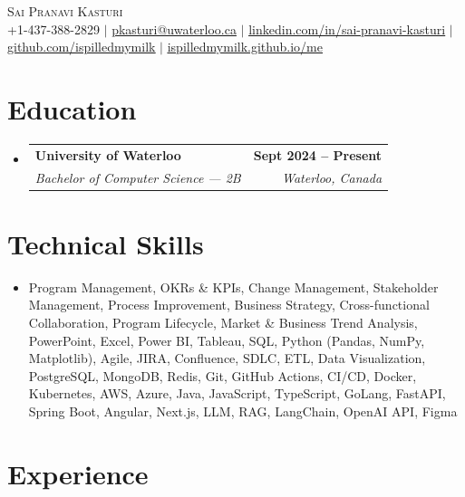 \documentclass[letterpaper,10pt]{article}
\makeatletter
\newcommand{\resumeSubheading}[4]{
  \vspace{-1pt}\item
    \begin{tabular*}{1.0\textwidth}[t]{l@{\extracolsep{\fill}}r}
      \textbf{#1} & \textbf{\small #2} \\
      \textit{\small#3} & \textit{\small #4} \\[-2pt]
    \end{tabular*}\vspace{-7pt}
}
\newcommand{\resumeSubHeadingListStart}{\begin{itemize}[leftmargin=0.0in, label={}]}
\newcommand{\resumeSubHeadingListEnd}{\end{itemize}}
\makeatother
\begin{document}

\vspace{-28pt}
\begin{center}
    {\Huge \scshape Sai Pranavi Kasturi} \\
    \small +1-437-388-2829 $|$ \underline{pkasturi@uwaterloo.ca} $|$
    \href{https://linkedin.com/in/sai-pranavi-kasturi-704807298}{\underline{linkedin.com/in/sai-pranavi-kasturi}} $|$
    \href{https://github.com/ispilledmymilk}{\underline{github.com/ispilledmymilk}} $|$
    \href{https://ispilledmymilk.github.io/me/}{\underline{ispilledmymilk.github.io/me}}
    \vspace{-10pt}
\end{center}

\vspace{-10pt}
\section{Education}
  \resumeSubHeadingListStart
    \resumeSubheading
      {University of Waterloo}{Sept 2024 -- Present}
      {Bachelor of Computer Science --- 2B}{Waterloo, Canada}
  \resumeSubHeadingListEnd
\vspace{-8pt}

\section{Technical Skills}
\begin{itemize}[leftmargin=0.05in, label={}]
  \small\item{
    Program Management, OKRs \& KPIs, Change Management, Stakeholder Management, Process Improvement, Business Strategy, Cross-functional Collaboration, Program Lifecycle, Market \& Business Trend Analysis, PowerPoint, Excel, Power BI, Tableau, SQL, Python (Pandas, NumPy, Matplotlib), Agile, JIRA, Confluence, SDLC, ETL, Data Visualization, PostgreSQL, MongoDB, Redis, Git, GitHub Actions, CI/CD, Docker, Kubernetes, AWS, Azure, Java, JavaScript, TypeScript, GoLang, FastAPI, Spring Boot, Angular, Next.js, LLM, RAG, LangChain, OpenAI API, Figma
  }
\end{itemize}
\vspace{-18pt}

\vspace{1.20pt}
\section{Experience}
\end{document}
